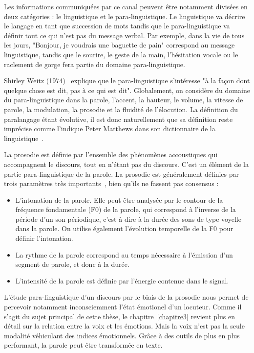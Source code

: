 Les informations communiquées par ce canal peuvent être notamment divisées en deux catégories : le linguistique et le para-linguistique.
Le linguistique va décrire le langage en tant que succession de mots tandis que le para-linguistique va définir tout ce qui n'est pas du message verbal. Par exemple, dans la vie de tous les jours, "Bonjour, je voudrais une baguette de pain" correspond au message linguistique, tandis que le sourire, le geste de la main, l'hésitation vocale ou le raclement de gorge fera partie du domaine para-linguistique.

Shirley Weitz (1974)~\cite{Weitz1974} explique que le para-linguistique s'intéresse "à la façon dont quelque chose est dit, pas à ce qui est dit". Globalement, on considère du domaine du para-linguistique dans la parole, l'accent, la hauteur, le volume, la vitesse de parole, la modulation, la prosodie et la fluidité de l'élocution.
La définition du paralangage étant évolutive, il est donc naturellement que sa définition reste imprécise comme l'indique Peter Matthews dans son dictionnaire de la linguistique~\cite{Matthews2014}.

La prosodie est définie par l'ensemble des phénomènes accoustiques qui accompagnent le discours, tout en n'étant pas du discours. C'est un élément de la partie para-linguistique de la parole. La prosodie est généralement définies par trois paramètres très importants~\cite{Srinivasan2003,Dohen2004}, bien qu'ils ne fassent pas consensus :
\begin{itemize}
  \item L'intonation de la parole. Elle peut être analysée par le contour de la fréquence fondamentale (F0) de la parole, qui correspond à l'inverse de la période d'un son périodique, c'est à dire à la durée des sons de type voyelle dans la parole. On utilise également l'évolution temporelle de la F0 pour définir l'intonation.
  \item La rythme de la parole correspond au temps nécessaire à l'émission d'un segment de parole, et donc à la durée.
  \item L'intensité de la parole est définie par l'énergie contenue dans le signal.
\end{itemize}
L'étude para-linguistique d'un discours par le biais de la prosodie nous permet de percevoir notamment inconsciemment l'état émotionel d'un locuteur. Comme il s'agit du sujet principal de cette thèse, le chapitre~\ref{chapitre3} revient plus en détail sur la relation entre la voix et les émotions. Mais la voix n'est pas la seule modalité véhiculant des indices émotionnels. Grâce à des outils de plus en plus performant, la parole peut être transformée en texte.

